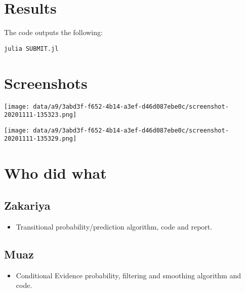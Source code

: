 \documentclass[11pt]{article}
\begin{document}
\section*{Results}
\label{sec:org4a73001}
The code outputs the following:
\begin{verbatim}
julia SUBMIT.jl
\end{verbatim}

\section*{Screenshots}
\label{sec:org3466924}
\begin{center}
\texttt{[image: data/a9/3abd3f-f652-4b14-a3ef-d46d087ebe0c/screenshot-20201111-135323.png]}
\end{center}
\begin{center}
\texttt{[image: data/a9/3abd3f-f652-4b14-a3ef-d46d087ebe0c/screenshot-20201111-135329.png]}
\end{center}

\section*{Who did what}
\label{sec:org8a29d99}
\subsection*{Zakariya}
\label{sec:org52942fd}
\begin{itemize}
\item Transitional probability/prediction algorithm, code and report.
\end{itemize}
\subsection*{Muaz}
\label{sec:org5f24d77}
\begin{itemize}
\item Conditional Evidence probability, filtering and smoothing algorithm and code.
\end{itemize}
\end{document}
